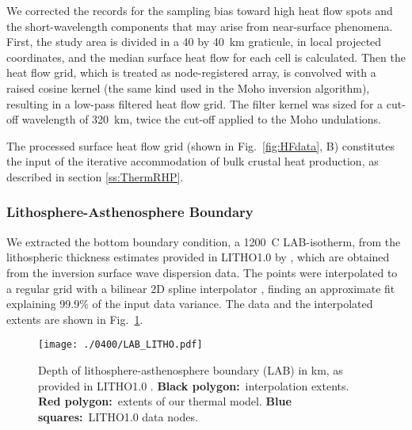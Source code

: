 {We corrected the records for the sampling bias toward high heat flow spots \parencite{Mareschal2013} and the short-wavelength components that may arise from near-surface phenomena.
First, the study area is divided in a 40 by 40~km graticule, in local projected coordinates, and the median surface heat flow for each cell is calculated.
Then the heat flow grid, which is treated as node-registered array, is convolved with a raised cosine kernel (the same kind used in the Moho inversion algorithm), resulting in a low-pass filtered heat flow grid.
The filter kernel was sized for a cut-off wavelength of 320~km, twice the cut-off applied to the Moho undulations.

The processed surface heat flow grid (shown in Fig.~\ref{fig:HFdata}, B) constitutes the input of the iterative accommodation of bulk crustal heat production, as described in section \ref{ss:ThermRHP}.

\subsubsection{Lithosphere-Asthenosphere Boundary}
\label{sss:ThermInputLAB}

We extracted the bottom boundary condition, a 1200~\textdegree C LAB-isotherm, from the lithospheric thickness estimates provided in LITHO1.0 by \textcite{Pasyanos2014}, which are obtained from the inversion surface wave dispersion data.
The points were interpolated to a regular grid with a bilinear 2D spline interpolator \parencite{Wessel2009}, finding an approximate fit explaining 99.9\% of the input data variance.
The data and the interpolated extents are shown in Fig.~\ref{fig:LAB}.

\begin{figure}
	\begin{adjustbox}{center}
	\texttt{[image: ./0400/LAB\_LITHO.pdf]}
	\end{adjustbox}
	\caption{Depth of lithosphere-asthenosphere boundary (LAB) in km, as provided in LITHO1.0 \parencite{Pasyanos2014}. \textbf{Black polygon:}~interpolation extents. \textbf{Red polygon:}~extents of our thermal model. \textbf{Blue squares:}~LITHO1.0 data nodes.}
	\label{fig:LAB}
\end{figure}

}
